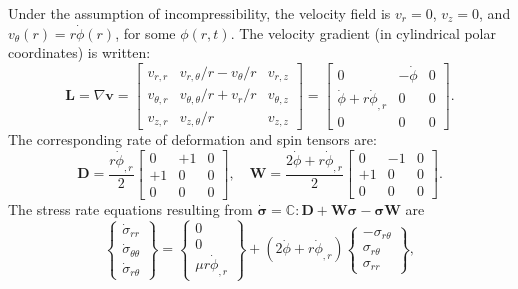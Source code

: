 Under the assumption of incompressibility, the velocity field is $v_r = 0$, $v_z = 0$, and $v_\theta (r) = r \dot{\phi}(r)$, for some $\phi(r,t)$. The velocity gradient (in cylindrical polar coordinates) is written:
\begin{equation}
  \bm{L} = \nabla \bm{v} = \left[ \begin{array}{ccc} v_{r,r} & v_{r,\theta}/r-v_\theta /r & v_{r,z} \\
      v_{\theta,r} & v_{\theta,\theta}/r + v_r /r & v_{\theta,z} \\
      v_{z,r} & v_{z,\theta} /r & v_{z,z} \end{array} \right] = 
  \left[ \begin{array}{ccc} 0 & -\dot{\phi} & 0 \\
      \dot{\phi} + r \dot{\phi}_{,r} & 0 & 0 \\
      0 & 0 & 0 \end{array} \right].
\end{equation}
The corresponding rate of deformation and spin tensors are:
\begin{equation}
  \bm{D} = \frac{r \dot{\phi}_{,r}}{2} \left[ \begin{array}{ccc} 0 & +1 & 0 \\
      +1 & 0 & 0 \\
      0 & 0 & 0 \end{array} \right], \quad \bm{W} = 
  \frac{2 \dot{\phi} + r \dot{\phi}_{,r}}{2} \left[ \begin{array}{ccc} 0 & - 1 & 0 \\
      +1 & 0 & 0 \\
      0 & 0 & 0 \end{array} \right].
\end{equation}
The stress rate equations resulting from $\dot{\boldsymbol{\sigma}} = \mathbb{C} : \bm{D} + \bm{W} \boldsymbol{\sigma} - \boldsymbol{\sigma} \bm{W}$ are
\begin{equation}
  \left\{ \begin{array}{c} \dot{\sigma}_{rr} \\ \dot{\sigma}_{\theta \theta} \\ \dot{\sigma}_{r \theta} \end{array} \right\} = \left\{ \begin{array}{c} 0 \\ 0 \\ \mu r \dot{\phi}_{,r} \end{array} \right\} + 
  (2 \dot{\phi} + r \dot{\phi}_{,r}) \left\{ \begin{array}{c} - \sigma_{r \theta} \\ \sigma_{r \theta} \\ \sigma_{rr} \end{array} \right\},
\end{equation}
